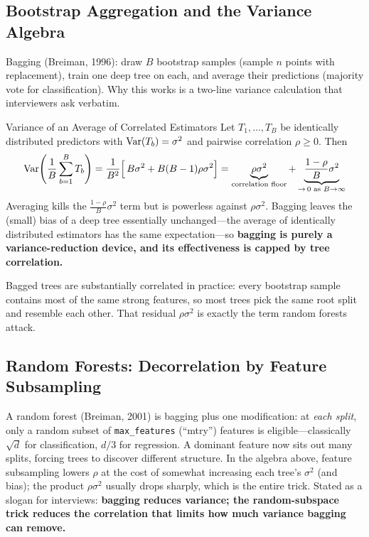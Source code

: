 \subsection{Bootstrap Aggregation and the Variance Algebra}

Bagging (Breiman, 1996): draw $B$ bootstrap samples (sample $n$ points with replacement), train one deep tree on each, and average their predictions (majority vote for classification). Why this works is a two-line variance calculation that interviewers ask verbatim.

\begin{mathresult}{Variance of an Average of Correlated Estimators}
Let $T_1, \ldots, T_B$ be identically distributed predictors with $\operatorname{Var}(T_b) = \sigma^2$ and pairwise correlation $\rho \ge 0$. Then
\begin{equation}
\operatorname{Var}\!\left(\frac{1}{B}\sum_{b=1}^B T_b\right)
= \frac{1}{B^2}\Big[\, B\sigma^2 + B(B-1)\rho\sigma^2 \Big]
= \underbrace{\rho\sigma^2}_{\text{correlation floor}} + \underbrace{\frac{1-\rho}{B}\sigma^2}_{\to\, 0 \text{ as } B \to \infty}
\end{equation}
Averaging kills the $\frac{1-\rho}{B}\sigma^2$ term but is powerless against $\rho\sigma^2$. Bagging leaves the (small) bias of a deep tree essentially unchanged---the average of identically distributed estimators has the same expectation---so \textbf{bagging is purely a variance-reduction device, and its effectiveness is capped by tree correlation.}
\end{mathresult}

Bagged trees are substantially correlated in practice: every bootstrap sample contains most of the same strong features, so most trees pick the same root split and resemble each other. That residual $\rho\sigma^2$ is exactly the term random forests attack.

\subsection{Random Forests: Decorrelation by Feature Subsampling}

A random forest (Breiman, 2001) is bagging plus one modification: at \textit{each split}, only a random subset of \texttt{max\_features} (``mtry'') features is eligible---classically $\sqrt{d}$ for classification, $d/3$ for regression. A dominant feature now sits out many splits, forcing trees to discover different structure. In the algebra above, feature subsampling lowers $\rho$ at the cost of somewhat increasing each tree's $\sigma^2$ (and bias); the product $\rho\sigma^2$ usually drops sharply, which is the entire trick. Stated as a slogan for interviews: \textbf{bagging reduces variance; the random-subspace trick reduces the correlation that limits how much variance bagging can remove.}

